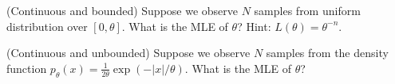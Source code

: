 \documentclass{discussion}
\begin{document}
\vspace{1em}

\begin{exercise}(Continuous and bounded)
Suppose we observe $N$ samples from uniform distribution over $[0, \theta]$. What is the MLE of $\theta$?  Hint: $L(\theta) = \theta^{-n}$.
\end{exercise}

\vspace{1em}

\begin{exercise}(Continuous and unbounded)
Suppose we observe $N$ samples from the density function $p_\theta(x) = \frac{1}{2\theta} \exp(-|x| / \theta).$ What is the MLE of $\theta$?
\end{exercise}





\end{document}
